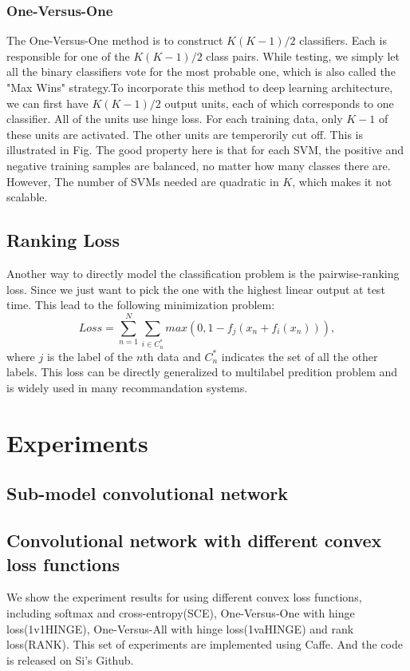\documentclass{article} %
\begin{document}
\subsubsection{One-Versus-One}
The One-Versus-One method is to construct $K(K-1)/2$ classifiers. Each is responsible for one of the $K(K-1)/2$ class pairs. While testing, we simply let all the binary classifiers vote for the most probable one, which is also called the "Max Wins" strategy.To incorporate this method to deep learning architecture, we can first have $K(K-1)/2$ output units, each of which corresponds to one classifier. All of the units use hinge loss. For each training data, only $K-1$ of these units
are activated. The other units are temperorily cut off. This is illustrated in Fig. The good property here is that for each SVM, the positive and negative training samples are balanced, no matter how many classes there are. However, The number of SVMs needed are quadratic in $K$, which makes it not scalable.

\subsection{Ranking Loss}
Another way to directly model the classification problem is the pairwise-ranking loss. Since we just want to pick the one with the highest linear output at test time. This lead to the following minimization problem:
\begin{equation}
Loss = \sum_{n=1}^{N}\sum_{i \in C_{n}^{*}}max(0, 1-f_{j}(x_{n}+f_{i}(x_{n}))),
\end{equation}
where $j$ is the label of the $n$th data and $C_{n}^{*}$ indicates the set of all the other labels. This loss can be directly generalized to multilabel predition problem and is widely used in many recommandation systems. 
\section{Experiments}
\subsection{Sub-model convolutional network}

\subsection{Convolutional network with different convex loss functions}
We show the experiment results for using different convex loss functions, including softmax and cross-entropy(SCE), One-Versus-One with hinge loss(1v1HINGE), One-Versus-All with hinge loss(1vaHINGE) and rank loss(RANK). This set of experiments are implemented using Caffe. And the code is released on Si's Github. 






\end{document}
